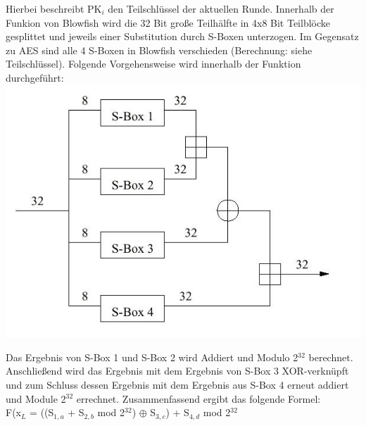 \documentclass[10pt, a4paper,headsepline]{scrreprt}
\begin{document}
\begin{minipage}[t]{10cm}

Hierbei beschreibt PK$_{i}$ den Teilschlüssel der aktuellen Runde. Innerhalb der Funkion von Blowfish wird die 32 Bit große Teilhälfte in 4x8 Bit Teilblöcke gesplittet und jeweils einer Substitution durch S-Boxen unterzogen. Im Gegensatz zu AES sind alle 4 S-Boxen in Blowfish verschieden (Berechnung: siehe Teilschlüssel). Folgende Vorgehensweise wird innerhalb der Funktion durchgeführt: \\
\includegraphics[scale=0.25]{blowfish_2.JPG} 
\label{fig:Funktion Blowfish} 
\hfill

Das Ergebnis von S-Box 1 und S-Box 2 wird Addiert und Modulo 2$^{32}$ berechnet. Anschließend wird das Ergebnis mit dem Ergebnis von S-Box 3 XOR-verknüpft und zum Schluss dessen Ergebnis mit dem Ergebnis aus S-Box 4 erneut addiert und Module 2$^{32}$ errechnet. Zusammenfassend ergibt das folgende Formel: \\
F(x$_{L}$ = ((S$_{1,a}$ + S$_{2,b}$ mod 2$^{32}$) $\oplus$ S$_{3,c}$) + S$_{4,d}$ mod 2$^{32}$ \\ \\
\end{minipage}
\end{document}
